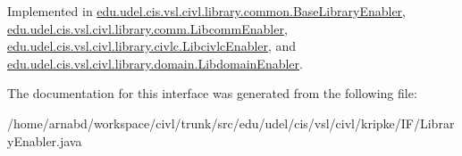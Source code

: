 Implemented in \hyperlink{classedu_1_1udel_1_1cis_1_1vsl_1_1civl_1_1library_1_1common_1_1BaseLibraryEnabler_aa02e5580539e71fd45208ae39ed9a9cc}{edu.\+udel.\+cis.\+vsl.\+civl.\+library.\+common.\+Base\+Library\+Enabler}, \hyperlink{classedu_1_1udel_1_1cis_1_1vsl_1_1civl_1_1library_1_1comm_1_1LibcommEnabler_ad20e493e1e307fde6e554e028486b911}{edu.\+udel.\+cis.\+vsl.\+civl.\+library.\+comm.\+Libcomm\+Enabler}, \hyperlink{classedu_1_1udel_1_1cis_1_1vsl_1_1civl_1_1library_1_1civlc_1_1LibcivlcEnabler_a7e233e81b1e86cee395f966e08873891}{edu.\+udel.\+cis.\+vsl.\+civl.\+library.\+civlc.\+Libcivlc\+Enabler}, and \hyperlink{classedu_1_1udel_1_1cis_1_1vsl_1_1civl_1_1library_1_1domain_1_1LibdomainEnabler_ab1d4bee1c22452e5de7ee3615202d5dd}{edu.\+udel.\+cis.\+vsl.\+civl.\+library.\+domain.\+Libdomain\+Enabler}.



The documentation for this interface was generated from the following file\+:\begin{DoxyCompactItemize}
\item 
/home/arnabd/workspace/civl/trunk/src/edu/udel/cis/vsl/civl/kripke/\+I\+F/Library\+Enabler.\+java\end{DoxyCompactItemize}
